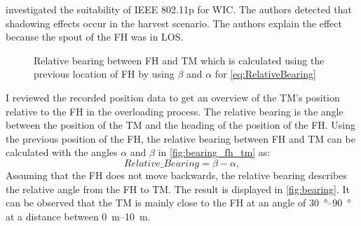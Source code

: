 \textcite{klingler_agriculture_2018} investigated the suitability of IEEE 802.11p for \ac{WIC}.
The authors detected that shadowing effects occur in the harvest scenario.
The authors explain the effect because the spout of the \ac{FH} was in \ac{LOS}.
\begin{figure}%
   \centering
   \caption{Relative bearing between \acf{FH} and \acf{TM} which is calculated using the previous location of \ac{FH} by using $\beta$ and $\alpha$ for \autoref{eq:RelativeBearing}}%
   \label{fig:bearing_fh_tm}%
\end{figure}
I reviewed the recorded position data to get an overview of the \ac{TM}'s position relative to the \ac{FH} in the overloading process. The relative bearing is the angle between the position of the \ac{TM} and the heading of the position of the \ac{FH}. Using the previous position of the \ac{FH}, the relative bearing between \ac{FH} and \ac{TM} can be calculated with the angles $\alpha$ and $\beta$ in \autoref{fig:bearing_fh_tm} as:
\begin{equation}\label{eq:RelativeBearing}
   Relative\_Bearing = \beta - \alpha ,
\end{equation}
Assuming that the \ac{FH} does not move backwards, the relative bearing describes the relative angle from the
\ac{FH} to \ac{TM}.
The result is displayed in \autoref{fig:bearing}.
It can be observed that the \ac{TM} is mainly close to the \ac{FH} at an angle of \SIrange{30}{90}{\degree} at
a distance between \SIrange{0}{10}{\metre}.

